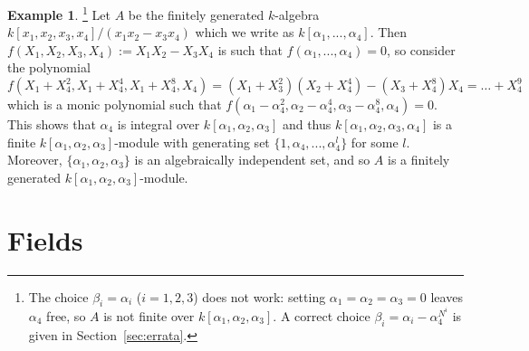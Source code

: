 \documentclass[12pt]{article}
\theoremstyle{plain}
\theoremstyle{definition}
\newtheorem{example}[thm]{Example}
\begin{document}
\begin{example}\footnote{The choice $\beta_i=\alpha_i$ ($i=1,2,3$) does not work: setting $\alpha_1=\alpha_2=\alpha_3=0$ leaves $\alpha_4$ free, so $A$ is not finite over $k[\alpha_1,\alpha_2,\alpha_3]$. A correct choice $\beta_i=\alpha_i-\alpha_4^{N^i}$ is given in Section~\ref{sec:errata}.}
Let $A$ be the finitely generated $k$-algebra $k[x_1,x_2,x_3,x_4]/(x_1x_2 - x_3x_4)$ which we write as $k[\alpha_1,...,\alpha_4]$. Then $f(X_1,X_2,X_3,X_4) := X_1X_2 - X_3X_4$ is such that $f(\alpha_1,...,\alpha_4) = 0$, so consider the polynomial
\[f(X_1 + X_4^2,X_1 + X_4^{4}, X_1 + X_4^8, X_4) = (X_1 + X_3^2)(X_2 + X_4^4) - (X_3 + X_4^8)X_4 = \hdots + X_4^9\]
which is a monic polynomial such that $f(\alpha_1 - \alpha_4^2, \alpha_2 - \alpha_4^4, \alpha_3 - \alpha_4^8, \alpha_4) = 0$. This shows that $\alpha_4$ is integral over $k[\alpha_1,\alpha_2,\alpha_3]$ and thus $k[\alpha_1,\alpha_2,\alpha_3,\alpha_4]$ is a finite $k[\alpha_1,\alpha_2,\alpha_3]$-module with generating set $\lbrace 1, \alpha_4,...,\alpha_4^l\rbrace$ for some $l$. Moreover, $\lbrace \alpha_1,\alpha_2,\alpha_3\rbrace$ is an algebraically independent set, and so $A$ is a finitely generated $k[\alpha_1,\alpha_2,\alpha_3]$-module.
\end{example}
%
\section{Fields}
\end{document}
